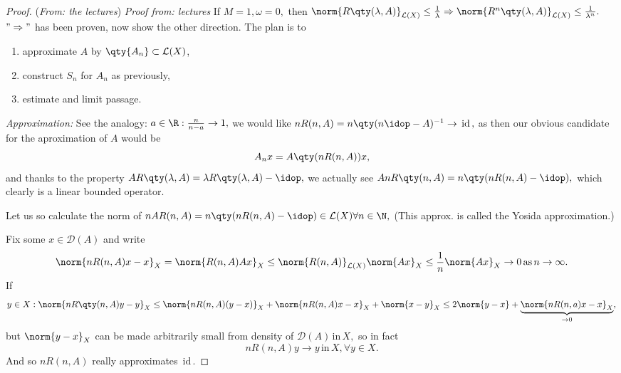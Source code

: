 \begin{proof}(\textit{From: the lectures})
	\textit{Proof from: lectures}
	If $M = 1, \omega = 0, $ then $\norm{R\qty(\lambda,A)}_{\mathcal{L}(X)}\leq \frac{1}{\lambda} \Rightarrow \norm{R^n\qty(\lambda, A)}_{\mathcal{L}(X)} \leq \frac{1}{\lambda^n}.$
	$"\Rightarrow"$ has been proven, now show the other direction. The plan is to 
\begin{enumerate}
	\item approximate $A$ by $\qty{A_n}\subset \mathcal{L}(X)$,
	\item construct $S_n$ for $A_n$ as previously,
	\item estimate and limit passage.
\end{enumerate}

\textit{Approximation:}
See the analogy: $a \in \R: \frac{n}{n-a} \to 1,$ we would like $n R(n,A)  = n \qty(n \idop - A)^{-1} \to \, \text{id} \,,$ as then our obvious candidate for the aproximation of $A$ would be
\[
	A_n x = A\qty(n R(n,A))x,
\]
and thanks to the property $AR\qty(\lambda,A) = \lambda R\qty(\lambda,A) - \idop,$ we actually see $A n R\qty(n,A) = n \qty(n R(n,A) - \idop),$ which clearly is a linear bounded operator.

Let us so calculate the norm of $nAR(n,A) = n\qty(nR(n,A)- \idop) \in \mathcal{L}(X) \forall n \in \N,$ (This approx. is called the Yosida approximation.) 

Fix some $x \in \mathcal{D}(A)$ and write
\[
	\norm{n R(n,A)x - x}_X = \norm{R(n,A)Ax}_X \leq \norm{R(n,A)}_{\mathcal{L}(X)} \norm{Ax}_X \leq \frac{1}{n}\norm{Ax}_X \to 0 \, \text{as} \, n\to \infty.
\]
If
\[
	y \in X: \norm{nR\qty(n,A)y -y}_X \leq \norm{nR(n,A)(y-x)}_X + \norm{nR(n,A)x-x}_X + \norm{x-y}_X \leq 2 \norm{y-x} + \underbrace{\norm{nR(n,a)x -x}_X}_{\to 0},
\]
but $\norm{y-x}_X$ can be made arbitrarily small from density of $\mathcal{D}(A) \, \text{in} \,X, $ so in fact
\[
	n R(n,A)y \to y \, \text{in} \, X, \forall y \in X.
\]
And so $n R(n,A)$ really approximates $\, \text{id} \,.$ 


\end{proof}
